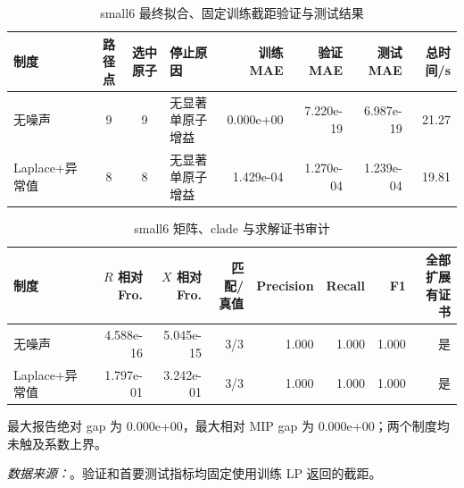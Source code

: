 \begin{table}[htbp]
\centering
\caption{small6 最终拟合、固定训练截距验证与测试结果}
\label{tab:small6-fit}
\scriptsize
\begin{tabularx}{\textwidth}{lcc>{\raggedright\arraybackslash}Xrrr r}
\toprule
制度 & 路径点 & 选中原子 & 停止原因 & 训练 MAE & 验证 MAE & 测试 MAE & 总时间/s \\
\midrule
无噪声 & 9 & 9 & 无显著单原子增益 & 0.000e+00 & 7.220e-19 & 6.987e-19 & 21.27 \\
Laplace+异常值 & 8 & 8 & 无显著单原子增益 & 1.429e-04 & 1.270e-04 & 1.239e-04 & 19.81 \\
\bottomrule
\end{tabularx}
\end{table}

\begin{table}[htbp]
\centering
\caption{small6 矩阵、clade 与求解证书审计}
\label{tab:small6-structure}
\scriptsize
\begin{tabular}{lrrrrrrr}
\toprule
制度 & $R$ 相对 Fro. & $X$ 相对 Fro. & 匹配/真值 & Precision & Recall & F1 & 全部扩展有证书 \\
\midrule
无噪声 & 4.588e-16 & 5.045e-15 & 3/3 & 1.000 & 1.000 & 1.000 & 是 \\
Laplace+异常值 & 1.797e-01 & 3.242e-01 & 3/3 & 1.000 & 1.000 & 1.000 & 是 \\
\bottomrule
\end{tabular}
\par\smallskip 最大报告绝对 gap 为 0.000e+00，最大相对 MIP gap 为 0.000e+00；两个制度均未触及系数上界。
\end{table}

\FloatBarrier
\noindent\textit{数据来源：}。验证和首要测试指标均固定使用训练 LP 返回的截距。
